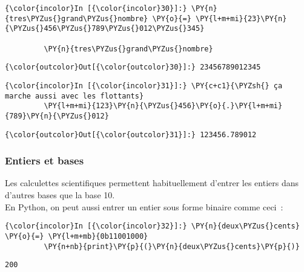     \begin{Verbatim}[commandchars=\\\{\}]
{\color{incolor}In [{\color{incolor}30}]:} \PY{n}{tres\PYZus{}grand\PYZus{}nombre} \PY{o}{=} \PY{l+m+mi}{23}\PY{n}{\PYZus{}456\PYZus{}789\PYZus{}012\PYZus{}345}
         
         \PY{n}{tres\PYZus{}grand\PYZus{}nombre}
\end{Verbatim}


\begin{Verbatim}[commandchars=\\\{\}]
{\color{outcolor}Out[{\color{outcolor}30}]:} 23456789012345
\end{Verbatim}
            
    \begin{Verbatim}[commandchars=\\\{\}]
{\color{incolor}In [{\color{incolor}31}]:} \PY{c+c1}{\PYZsh{} ça marche aussi avec les flottants}
         \PY{l+m+mi}{123}\PY{n}{\PYZus{}456}\PY{o}{.}\PY{l+m+mi}{789}\PY{n}{\PYZus{}012}
\end{Verbatim}


\begin{Verbatim}[commandchars=\\\{\}]
{\color{outcolor}Out[{\color{outcolor}31}]:} 123456.789012
\end{Verbatim}
            
    \hypertarget{entiers-et-bases}{%
\subsubsection{Entiers et bases}\label{entiers-et-bases}}

    Les calculettes scientifiques permettent habituellement d'entrer les
entiers dans d'autres bases que la base 10.\\

En Python, on peut aussi entrer un entier sous forme binaire comme
ceci~:

    \begin{Verbatim}[commandchars=\\\{\}]
{\color{incolor}In [{\color{incolor}32}]:} \PY{n}{deux\PYZus{}cents} \PY{o}{=} \PY{l+m+mb}{0b11001000}
         \PY{n+nb}{print}\PY{p}{(}\PY{n}{deux\PYZus{}cents}\PY{p}{)}
\end{Verbatim}


    \begin{Verbatim}[commandchars=\\\{\}]
200

    \end{Verbatim}

